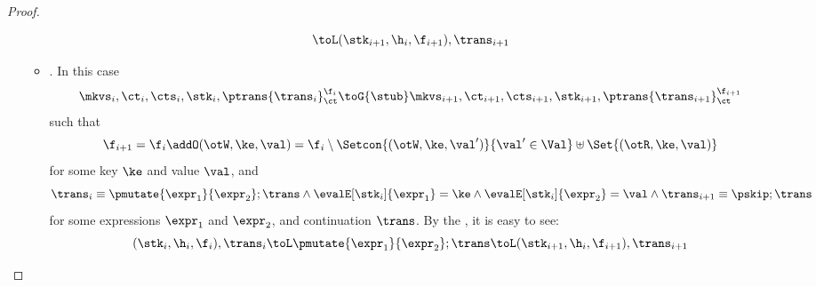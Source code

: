 \begin{proof}
\begin{itemize}
\begin{itemize}
\[                    \toL (\stk_{i+1}, \h_i, \f_{i+1} ), \trans_{i+1}
                \]
            \item {}.
                In this case
                \[
                    \mkvs_i, \ct_i, \cts_i, \stk_i, \ptrans{\trans_i}_\ct^{\f_i}
                    \toG{\stub}
                    \mkvs_{i+1}, \ct_{i+1}, \cts_{i+1}, \stk_{i+1}, \ptrans{\trans_{i+1}}_\ct^{\f_{i+1}}
                \]
                such that
                \[
                    \f_{i+1} = \f_i \addO (\otW, \ke, \val) = \f_i \setminus \Setcon{(\otW, \ke, \val')}{\val' \in \Val} \uplus \Set{(\otR, \ke, \val)}
                \]
                for some key \( \ke \) and value \( \val \), and
                \[
                    \trans_{i} \equiv \pmutate{\expr_1}{\expr_2} ; \trans 
                    \land \evalE[\stk_i]{\expr_1} = \ke 
                    \land \evalE[\stk_i]{\expr_2} = \val 
                    \land  \trans_{i+1} \equiv \pskip ; \trans
                \]
                for some expressions \( \expr_1 \) and \( \expr_2 \), and continuation \( \trans \).
                By the , it is easy to see: 
                \[
                    (\stk_i, \h_i, \f_i), \trans_i \toL \pmutate{\expr_1}{\expr_2} ; \trans 
                    \toL (\stk_{i+1}, \h_i, \f_{i+1} ), \trans_{i+1}
                \]
        \end{itemize}
    \end{itemize}
\end{proof}

